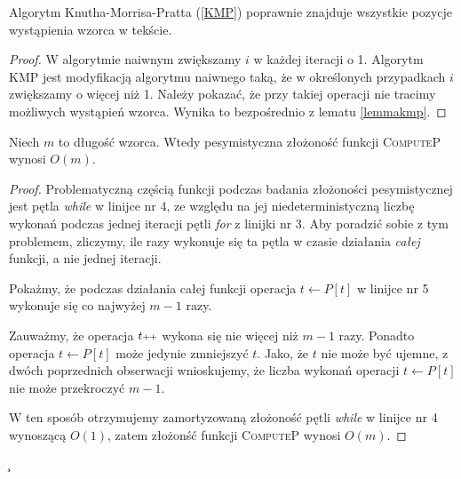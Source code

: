 \begin{theorem}
	Algorytm Knutha-Morrisa-Pratta (\ref{KMP}) poprawnie znajduje wszystkie pozycje wystąpienia wzorca w tekście. 
	\begin{proof}
		W algorytmie naiwnym zwiększamy $i$ w każdej iteracji o 1. Algorytm KMP jest modyfikacją algorytmu naiwnego taką, że w określonych przypadkach $i$ zwiększamy o więcej niż 1. Należy pokazać, że przy takiej operacji nie tracimy możliwych wystąpień wzorca. Wynika to bezpośrednio z lematu \ref{lemmakmp}.
	\end{proof}
\end{theorem}

\begin{lemma}
	\label{lemma:zlozonoscComputeP}
	Niech $m$ to długość wzorca. Wtedy pesymistyczna złożoność funkcji \textsc{ComputeP} wynosi $O(m)$.
	\begin{proof}
		Problematyczną częścią funkcji podczas badania złożoności pesymistycznej jest pętla \textit{while} w linijce nr 4, 
		ze względu na jej niedeterministyczną liczbę wykonań podczas jednej iteracji pętli \textit{for} z linijki nr 3. Aby poradzić sobie z tym problemem, zliczymy, ile razy wykonuje się ta pętla
		w czasie działania \textit{całej} funkcji, a nie jednej iteracji.
		 
		Pokażmy, że podczas działania całej funkcji operacja $t \gets P[t]$ w linijce nr 5 wykonuje się co najwyżej $m-1$ razy.
		
		Zauważmy, że operacja $t\scalebox{0.75}{++}$ wykona się nie więcej niż $m-1$ razy.
		Ponadto operacja $t \gets P[t]$ może jedynie zmniejszyć $t$. Jako, że $t$ nie może
		być ujemne, z dwóch poprzednich obserwacji wnioskujemy, że
		liczba wykonań operacji $t \gets P[t]$ nie może przekroczyć $m-1$.
		
		W ten sposób otrzymujemy zamortyzowaną złożoność pętli \textit{while} w linijce nr 4
		wynoszącą $O(1)$, zatem złożonść funkcji \textsc{ComputeP} wynosi $O(m)$.
		
	\end{proof}	
	\c
\end{lemma}


